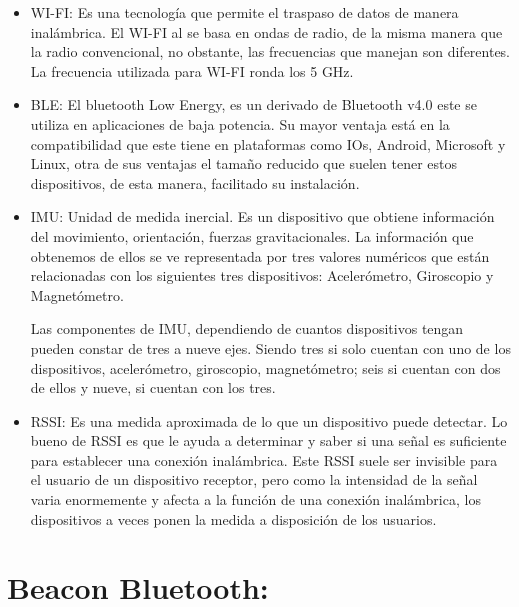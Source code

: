 \documentclass[conference,compsoc,onecolumn]{IEEEtran}
\begin{document}
\begin{itemize}

\item {WI-FI: }Es una tecnología que permite el traspaso de datos de manera inalámbrica. El WI-FI al se basa
en ondas de radio, de la misma manera que la radio convencional, no obstante, las frecuencias que
manejan son diferentes. La frecuencia utilizada para WI-FI ronda los 5 GHz.

\enskip

\item {BLE: }El bluetooth Low Energy, es un derivado de Bluetooth v4.0 este se utiliza en aplicaciones de
baja potencia. Su mayor ventaja está en la compatibilidad que este tiene en plataformas como IOs,
Android, Microsoft y Linux, otra de sus ventajas el tamaño reducido que suelen tener estos
dispositivos, de esta manera, facilitado su instalación.


\enskip 

\item {IMU: }Unidad de medida inercial. Es un dispositivo que obtiene información del movimiento,
orientación, fuerzas gravitacionales. La información que obtenemos de ellos se ve representada por
tres valores numéricos que están relacionadas con los siguientes tres dispositivos: Acelerómetro,
Giroscopio y Magnetómetro.

\enskip

Las componentes de IMU, dependiendo de cuantos dispositivos tengan pueden constar de tres a nueve
ejes. Siendo tres si solo cuentan con uno de los dispositivos, acelerómetro, giroscopio, magnetómetro;
seis si cuentan con dos de ellos y nueve, si cuentan con los tres.

\enskip

\item {RSSI: }Es una medida aproximada de lo que un dispositivo puede detectar. Lo bueno de RSSI es que
le ayuda a determinar y saber si una señal es suficiente para establecer una conexión inalámbrica. Este
RSSI suele ser invisible para el usuario de un dispositivo receptor, pero como la intensidad de la señal
varia enormemente y afecta a la función de una conexión inalámbrica, los dispositivos a veces ponen
la medida a disposición de los usuarios.

\end{itemize}

 \section{Beacon Bluetooth:}
\end{document}
